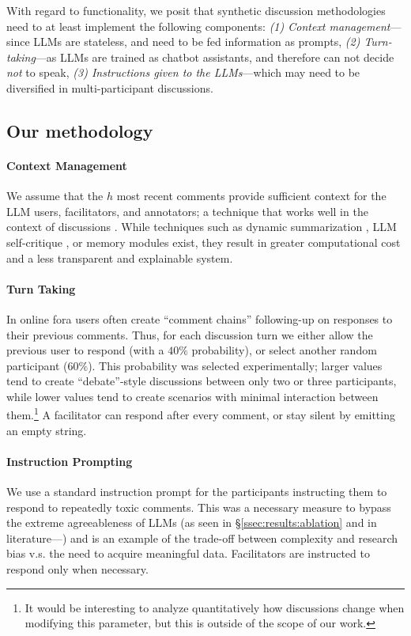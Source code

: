 With regard to functionality, we posit that synthetic discussion methodologies need to at least implement the following components: \emph{(1) Context management}---since LLMs are stateless, and need to be fed information as prompts, \emph{(2) Turn-taking}---as LLMs are trained as chatbot assistants, and therefore can not decide \emph{not} to speak, \emph{(3) Instructions given to the LLMs}---which may need to be diversified in multi-participant discussions.

\subsection{Our methodology}
\label{ssec:methodology:us}

\paragraph{Context Management} We assume that the $h$ most recent comments provide sufficient context for the LLM users, facilitators, and annotators; a technique that works well in the context of discussions \cite{pavlopoulos_2020_toxicity}. While techniques such as dynamic summarization \cite{balog_2024}, LLM self-critique \cite{yu_2024_fincon}, or memory modules \cite{Vezhnevets2023GenerativeAM} exist, they result in greater computational cost and a less transparent and explainable system.


\paragraph{Turn Taking} In online fora users often create ``comment chains'' following-up on responses to their previous comments. Thus, for each discussion turn we either allow the previous user to respond (with a $40\%$ probability), or select another random participant ($60\%$). This probability was selected experimentally; larger values tend to create ``debate''-style discussions between only two or three participants, while lower values tend to create scenarios with minimal interaction between them.\footnote{It would be interesting to analyze quantitatively how discussions change when modifying this parameter, but this is outside of the scope of our work.} A facilitator can respond after every comment, or stay silent by emitting an empty string.


\paragraph{Instruction Prompting} We use a standard instruction prompt for the participants instructing them to respond to repeatedly toxic comments. This was a necessary measure to bypass the extreme agreeableness of LLMs (as seen in \S\ref{ssec:results:ablation} and in literature---\citet{park2023game,anthis_2025}) and is an example of the trade-off between complexity and research bias v.s. the need to acquire meaningful data. Facilitators are instructed to respond only when necessary.

